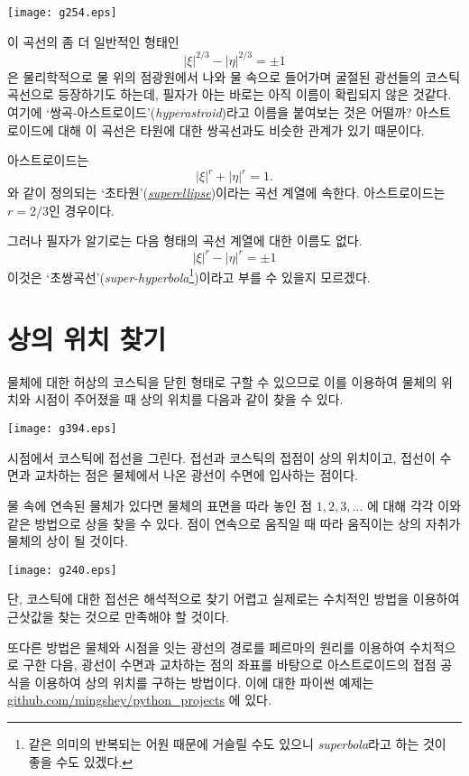 \documentclass[twocolumn]{article}
\begin{document}
\texttt{[image: g254.eps]}

이 곡선의 좀 더 일반적인 형태인 
$$ \left| \xi \right|^{2/3} - \left| \eta \right|^{2/3} = \pm1 $$
은 물리학적으로 물 위의 점광원에서 나와 물 속으로 들어가며 굴절된 광선들의 코스틱 
곡선으로 등장하기도 하는데, 필자가 아는 바로는 아직 이름이 확립되지 않은 것같다.
여기에 `쌍곡-아스트로이드'(\emph{hyperastroid})라고 이름을 붙여보는 것은 어떨까?
아스트로이드에 대해 이 곡선은 타원에 대한 쌍곡선과도 비슷한 관계가 있기 때문이다. 
 
아스트로이드는 
$$ \left| \xi \right|^{r} + \left| \eta \right|^{r} = 1. $$
와 같이 정의되는 `초타원'(\href{https://mathworld.wolfram.com/Astroid.html}%
{\emph{superellipse}})이라는 곡선 계열에 속한다. 
아스트로이드는 $r=2/3$인 경우이다.
 
그러나 필자가 알기로는 다음 형태의 곡선 계열에 대한 이름도 없다.
$$ \left| \xi \right|^{r} - \left| \eta \right|^{r} = \pm 1 $$
이것은 `초쌍곡선'(\emph{super-hyperbola}\footnote{같은 의미의 반복되는 어원
때문에 거슬릴 수도 있으니 \emph{superbola}라고 하는 것이 
좋을 수도 있겠다.})이라고 부를 수 있을지 모르겠다.

\section{상의 위치 찾기}
물체에 대한 허상의 코스틱을 닫힌 형태로 구할 수 있으므로 이를 이용하여 물체의 위치와 
시점이 주어졌을 때 상의 위치를 다음과 같이 찾을 수 있다.

\texttt{[image: g394.eps]}

시점에서 코스틱에 접선을 그린다. 접선과 코스틱의 접점이 상의 위치이고, 접선이 수면과 
교차하는 점은 물체에서 나온 광선이 수면에 입사하는 점이다.

물 속에 연속된 물체가 있다면 물체의 표면을 따라 놓인 점 $1, 2, 3, \dots$ 에 대해 
각각 이와 같은 방법으로 상을 찾을 수 있다. 점이 연속으로 움직일 때 따라 움직이는 상의 자취가 
물체의 상이 될 것이다.

\texttt{[image: g240.eps]}

단, 코스틱에 대한 접선은 해석적으로 찾기 어렵고 실제로는 수치적인 방법을 이용하여 
근삿값을 찾는 것으로 만족해야 할 것이다.

또다른 방법은 물체와 시점을 잇는 광선의 경로를 페르마의 원리를 이용하여 수치적으로 
구한 다음, 광선이 수면과 교차하는 점의 좌표를 바탕으로 아스트로이드의 접점 공식을 이용하여
상의 위치를 구하는 방법이다. 이에 대한 파이썬 예제는  
\href{https://github.com/mingshey/python_projects/blob/main/Refraction_Image.ipynb}%
{github.com/mingshey/python\_projects} 에 있다.
\end{document}
